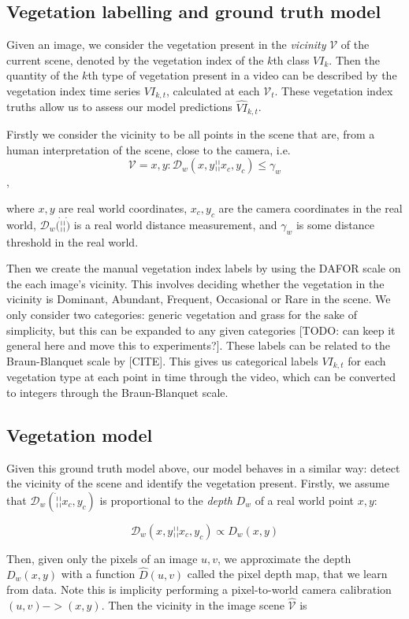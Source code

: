 \subsection{Vegetation labelling and ground truth model}
Given an image, we consider the vegetation present in the \textit{vicinity} $\mathcal{V}$ of the current scene, denoted by the vegetation index of the $k$th class $VI_k$. Then the quantity of the $k$th type of vegetation present in a video can be described by the vegetation index time series $VI_{k,t}$, calculated at each $\mathcal{V}_t$. These vegetation index truths allow us to assess our model predictions $\hat{VI}_{k,t}$.

Firstly we consider the vicinity to be all points in the scene that are, from a human interpretation of the scene, close to the camera, i.e. 
$$\mathcal{V} = {x,y} : \mathcal{D}_w(x,y¦¦x_c, y_c)\leq \gamma_w$$, 

where $x,y$ are real world coordinates, $x_c, y_c$ are the camera coordinates in the real world, $\mathcal{D}_w(\dot¦¦\dot)$ is a real world distance measurement, and $\gamma_w$ is some distance threshold in the real world. 

Then we create the manual vegetation index labels by using the DAFOR scale on the each image's vicinity. This involves deciding whether the vegetation in the vicinity is Dominant, Abundant, Frequent, Occasional or Rare in the scene. We only consider two categories: generic vegetation and grass for the sake of simplicity, but this can be expanded to any given categories [TODO: can keep it general here and move this to experiments?]. These labels can be related to the Braun-Blanquet scale by [CITE]. This gives us categorical labels $VI_{k,t}$ for each vegetation type at each point in time through the video, which can be converted to integers through the Braun-Blanquet scale.


\subsection{Vegetation model}
Given this ground truth model above, our model behaves in a similar way: detect the vicinity of the scene and identify the vegetation present. Firstly, we assume that $\mathcal{D}_w(\dot¦¦x_c,y_c)$ is proportional to the \textit{depth} $D_w$ of a real world point $x,y$:

$$\mathcal{D}_w(x,y¦¦x_c,y_c) \propto D_w(x,y)$$

Then, given only the pixels of an image $u,v$, we approximate the depth $D_w(x,y)$ with a function $\hat{D}(u,v)$ called the pixel depth map, that we learn from data. Note this is implicity performing a pixel-to-world camera calibration $(u,v)->(x,y)$. Then the vicinity in the image scene $\hat{\mathcal{V}}$ is

